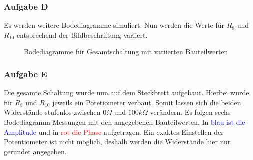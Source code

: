 \subsubsection{Aufgabe D}
\label{D}
Es werden weitere Bodediagramme simuliert. Nun werden die Werte für $R_{8}$ und $R_{10}$ entsprechend der Bildbeschriftung variiert.
\begin{figure}[h]
\caption{Bodediagramme für Gesamtschaltung mit variierten Bauteilwerten}
\end{figure}

\newpage
\subsubsection{Aufgabe E}
\label{E}
Die gesamte Schaltung wurde nun auf dem Steckbrett aufgebaut. Hierbei wurde für $R_{8}$ und $R_{10}$ jeweils ein Potetiometer verbaut. Somit lassen sich die beiden Widerstände stufenlos zwischen $\si{0}{\Omega}$ und $\si{100}{k\Omega}$ verändern. Es folgen sechs Bodediagramm-Messungen mit den angegebenen Bauteilwerten. In \textcolor{blue}{blau ist die Amplitude} und in \textcolor{red}{rot die Phase} aufgetragen. Ein exaktes Einstellen der Potentiometer ist nicht möglich, deshalb werden die Widerstände hier nur gerundet angegeben.

